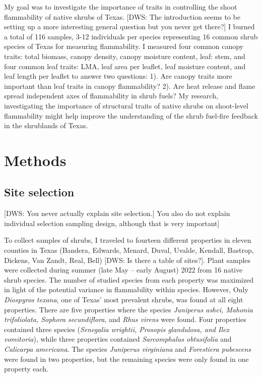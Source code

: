 \documentclass[12pt]{report}
\begin{document}
My goal was to investigate the importance of traits in controlling the shoot flammability of native shrubs of Texas. [DWS: The introduction seems to be setting up a more interesting general question but you never get there?] I burned a total of 116 samples, 3-12 individuals per species representing 16 common shrub species of Texas for measuring flammability. I measured four common canopy traits: total biomass, canopy density, canopy moisture content, leaf: stem, and four common leaf traits: LMA, leaf area per leaflet, leaf moisture content, and leaf length per leaflet to answer two questions: 1). Are canopy traits more important than leaf traits in canopy flammability? 2). Are heat release and flame spread independent axes of flammability in shrub fuels? My research, investigating the importance of structural traits of native shrubs on shoot-level flammability might help improve the understanding of the shrub fuel-fire feedback in the shrublands of Texas.


\section{Methods}
\subsection{Site selection}

[DWS: You never actually explain site selection.] You also do not explain individual selection sampling design, although that is very important]

To collect samples of shrubs, I traveled to fourteen different properties in eleven counties in Texas (Bandera, Edwards, Menard, Duval, Uvalde, Kendall, Bastrop, Dickens, Van Zandt, Real, Bell) [DWS: Is there a table of sites?]. Plant samples were collected during summer (late May -- early August) 2022 from 16 native shrub species. The number of studied species from each property was maximized in light of the potential variance in flammability within species. However, Only \emph{Diospyros texana}, one of Texas' most prevalent shrubs, was found at all eight properties. There are five properties where the species \emph{Juniperus ashei, Mahonia trifoliolata, Sophora secundiflora}, and \emph{Rhus virens} were found. Four properties contained three species (\emph{Senegalia wrightii, Prosopis glandulosa, and Ilex vomitoria}), while three properties contained \emph{Sarcomphalus obtusifolia} \citep{hauenschild2016phylogenetic} and \emph{Calicarpa americana}. The species \emph{Juniperus virginiana} and \emph{Forestiera pubescens} were found in two properties, but the remaining species were only found in one property each.
\end{document}
